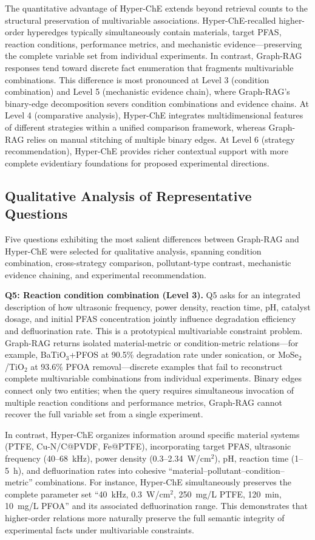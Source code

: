The quantitative advantage of Hyper-ChE extends beyond retrieval counts to the structural preservation of multivariable associations. Hyper-ChE-recalled higher-order hyperedges typically simultaneously contain materials, target PFAS, reaction conditions, performance metrics, and mechanistic evidence---preserving the complete variable set from individual experiments. In contrast, Graph-RAG responses tend toward discrete fact enumeration that fragments multivariable combinations. This difference is most pronounced at Level 3 (condition combination) and Level 5 (mechanistic evidence chain), where Graph-RAG's binary-edge decomposition severs condition combinations and evidence chains. At Level 4 (comparative analysis), Hyper-ChE integrates multidimensional features of different strategies within a unified comparison framework, whereas Graph-RAG relies on manual stitching of multiple binary edges. At Level 6 (strategy recommendation), Hyper-ChE provides richer contextual support with more complete evidentiary foundations for proposed experimental directions.

\subsection{Qualitative Analysis of Representative Questions}

Five questions exhibiting the most salient differences between Graph-RAG and Hyper-ChE were selected for qualitative analysis, spanning condition combination, cross-strategy comparison, pollutant-type contrast, mechanistic evidence chaining, and experimental recommendation.

\textbf{Q5: Reaction condition combination (Level 3).} Q5 asks for an integrated description of how ultrasonic frequency, power density, reaction time, pH, catalyst dosage, and initial PFAS concentration jointly influence degradation efficiency and defluorination rate. This is a prototypical multivariable constraint problem. Graph-RAG returns isolated material-metric or condition-metric relations---for example, BaTiO$_{3}$+PFOS at 90.5\% degradation rate under sonication, or MoSe$_{2}$/TiO$_{2}$ at 93.6\% PFOA removal---discrete examples that fail to reconstruct complete multivariable combinations from individual experiments. Binary edges connect only two entities; when the query requires simultaneous invocation of multiple reaction conditions and performance metrics, Graph-RAG cannot recover the full variable set from a single experiment.

In contrast, Hyper-ChE organizes information around specific material systems (PTFE, Cu-N/C@PVDF, Fe@PTFE), incorporating target PFAS, ultrasonic frequency (40--68~kHz), power density (0.3--2.34~W/cm$^{2}$), pH, reaction time (1--5~h), and defluorination rates into cohesive ``material--pollutant--condition--metric'' combinations. For instance, Hyper-ChE simultaneously preserves the complete parameter set ``40~kHz, 0.3~W/cm$^{2}$, 250~mg/L PTFE, 120~min, 10~mg/L PFOA'' and its associated defluorination range. This demonstrates that higher-order relations more naturally preserve the full semantic integrity of experimental facts under multivariable constraints.

